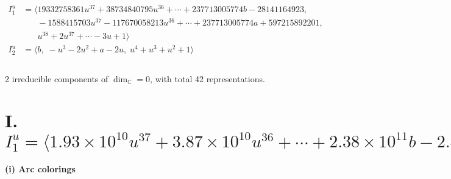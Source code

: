 \documentclass[1p]{elsarticle_modified}
\theoremstyle{definition}
\begin{document}
\begin{align*}
I^u_{1}&=\langle 
19332758361 u^{37}+38734840795 u^{36}+\cdots+237713005774 b-28141164923,\\
\phantom{I^u_{1}}&\phantom{= \langle  }-1588415703 u^{37}-117670058213 u^{36}+\cdots+237713005774 a+597215892201,\\
\phantom{I^u_{1}}&\phantom{= \langle  }u^{38}+2 u^{37}+\cdots-3 u+1\rangle \\
I^u_{2}&=\langle 
b,\;- u^3-2 u^2+a-2 u,\;u^4+u^3+u^2+1\rangle \\
\\
\end{align*}
\raggedright * 2 irreducible components of $\dim_{\mathbb{C}}=0$, with total 42 representations.\\
\newpage
\renewcommand{\arraystretch}{1}
\centering \section*{I. $I^u_{1}= \langle 1.93\times10^{10} u^{37}+3.87\times10^{10} u^{36}+\cdots+2.38\times10^{11} b-2.81\times10^{10},\;-1.59\times10^{9} u^{37}-1.18\times10^{11} u^{36}+\cdots+2.38\times10^{11} a+5.97\times10^{11},\;u^{38}+2 u^{37}+\cdots-3 u+1 \rangle$}
\flushleft \textbf{(i) Arc colorings}\\
\end{document}
